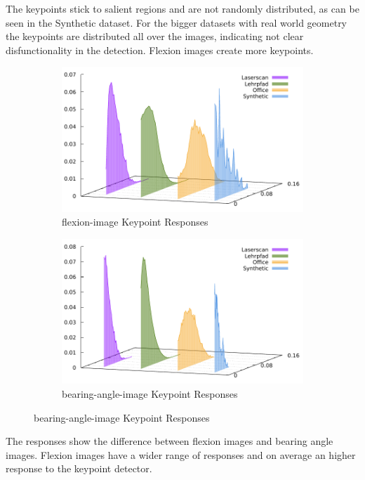 The keypoints stick to salient regions and are not randomly distributed, as can be seen in the Synthetic dataset.
For the bigger datasets with real world geometry the keypoints are distributed all over the images, indicating not clear disfunctionality in the detection.
Flexion images create more keypoints.
\begin{figure}[H]
\begin{subfigure}[t]{0.45\linewidth}
    \includegraphics[width=\linewidth]{chapter06/results/SIFT/flexion/response.pdf}%
    \caption{\gls{flexion-image} Keypoint Responses}
\end{subfigure}\quad
\begin{subfigure}[t]{0.45\linewidth}
    \includegraphics[width=\linewidth]{chapter06/results/SIFT/bearing/response.pdf}%
    \caption{\gls{bearing-angle-image} Keypoint Responses}
\end{subfigure}
\end{figure}
The responses show the difference between flexion images and bearing angle images.
Flexion images have a wider range of responses and on average an higher response to the keypoint detector.

